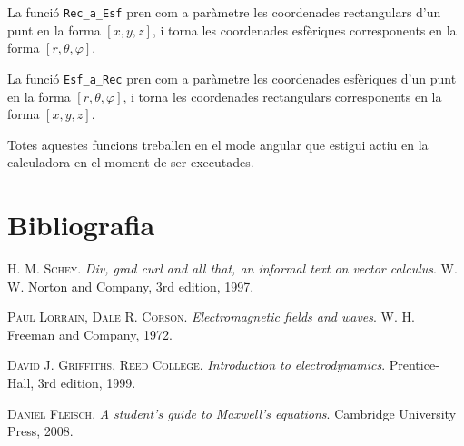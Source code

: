 \documentclass[catalan,a4paper,twoside,11pt]{article}
\begin{document}
La funció \texttt{Rec\_a\_Esf} pren com a paràmetre les coordenades rectangulars  d'un punt en la forma $[x,y,z]$, i torna les coordenades esfèriques corresponents en la forma $[r,\theta,\varphi]$.


La funció \texttt{Esf\_a\_Rec} pren com a paràmetre les coordenades esfèriques d'un punt en la forma $[r,\theta,\varphi]$, i torna les coordenades rectangulars corresponents en la forma $[x,y,z]$.



Totes aquestes funcions treballen en el mode angular que estigui actiu en la calculadora en el moment de ser executades.



\section{Bibliografia}

\textsc{H. M. Schey}. \textsl{Div, grad curl and all that, an informal text on vector calculus}.  W. W. Norton and Company, 3rd edition, 1997.

\textsc{Paul Lorrain, Dale R. Corson}. \textsl{Electromagnetic fields and waves}.  W. H. Freeman and Company, 1972.

\textsc{David J. Griffiths, Reed College}. \textsl{Introduction to electrodynamics}. Prentice-Hall, 3rd edition, 1999.

\textsc{Daniel Fleisch}. \textsl{A student's guide to Maxwell's equations}. Cambridge University Press, 2008.
\end{document}
